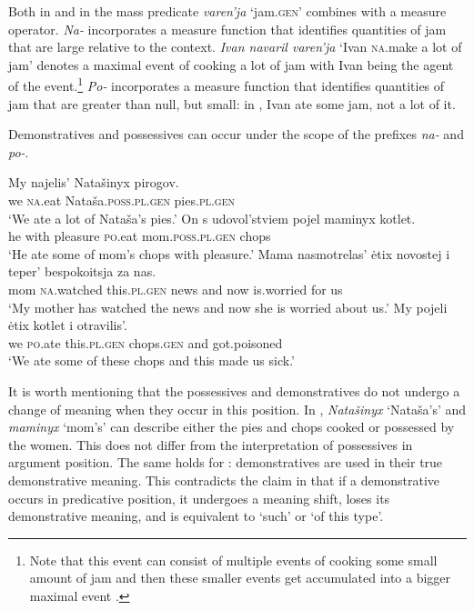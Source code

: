 \documentclass[output=paper,
colorlinks,
citecolor=brown,
newtxmath
]{langscibook}
\begin{document}
\noindent Both in  and in  the mass predicate \textit{varen'ja} `jam.\textsc{gen}' combines with a measure operator. \textit{Na-} incorporates a measure function that identifies quantities of jam that are large relative to the context. \textit{Ivan navaril varen'ja} `Ivan \textsc{na}.make a lot of jam' denotes a maximal event of cooking a lot of jam with Ivan being the agent of the event.\footnote{Note that this event can consist of multiple events of cooking some small amount of jam and then these smaller events get accumulated into a bigger maximal event \citep{Filip.Rothstein2006}.} \textit{Po-} incorporates a measure function that identifies quantities of jam that are greater than null, but small: in , Ivan ate some jam, not a lot of it.

Demonstratives and possessives can occur under the scope of the prefixes \textit{na-} and \textit{po-}. 


\ea\label{pirogi_kotlet}
    \ea \gll My najelis' Natašinyx pirogov.\\
    we {\textsc{na}.eat} Nataša.\textsc{poss.pl.gen} pies.\textsc{pl.gen}\\     %
    \glt `We ate a lot of Nataša's pies.'
    \ex \gll On s udovol'stviem pojel maminyx kotlet.\\
    he with pleasure {\textsc{po}.eat} mom.\textsc{poss.pl.gen} chops\\
    \glt `He ate some of mom's chops with pleasure.'
\z\ex\label{novosti} 
    \ea \gll Mama nasmotrelas' ėtix novostej i teper' bespokoitsja za nas.\\
    mom {\textsc{na}.watched} this.\textsc{pl.gen} news and now is.worried for us\\
    \glt `My mother has watched the news and now she is worried about us.'
    \ex \gll My pojeli ėtix kotlet i otravilis'.\\
    we {\textsc{po}.ate} this.\textsc{pl.gen} chops.\textsc{gen} and got.poisoned\\
    \glt `We ate some of these chops and this made us sick.'
\z\z

\noindent It is worth mentioning that the possessives and demonstratives do not undergo a change of meaning when they occur in this position. In , \textit{Natašinyx} `Nataša's' and \textit{maminyx} `mom's' can describe either the pies and chops cooked or possessed by the women. This does not differ from the interpretation of possessives in argument position. The same holds for :  demonstratives are used in their true demonstrative meaning. This contradicts the claim in \citet{Kagan.Pereltsvaig2014} that if a demonstrative occurs in predicative position, it undergoes a meaning shift, loses its demonstrative meaning, and is equivalent to `such' or `of this type'. 
\end{document}
